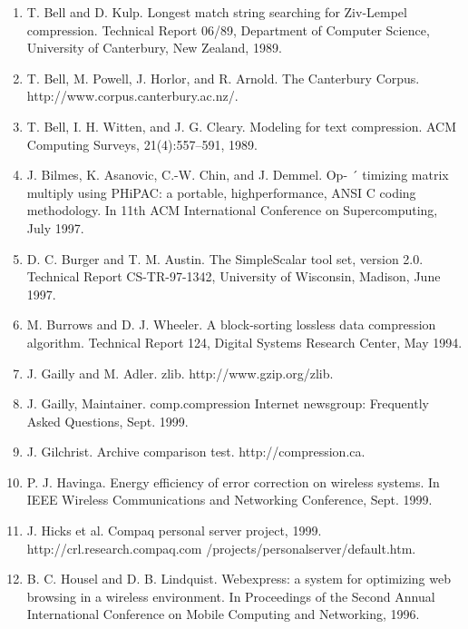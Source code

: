 \documentclass{article}
\begin{document}
\begin{enumerate}
	\item T. Bell and D. Kulp. Longest match string searching for
	Ziv-Lempel compression. Technical Report 06/89, Department of Computer Science, University of Canterbury,
	New Zealand, 1989.
	
	\item T. Bell, M. Powell, J. Horlor, and R. Arnold. The Canterbury Corpus. http://www.corpus.canterbury.ac.nz/.

	\item T. Bell, I. H. Witten, and J. G. Cleary. Modeling for text
	compression. ACM Computing Surveys, 21(4):557–591,
	1989.

	\item J. Bilmes, K. Asanovic, C.-W. Chin, and J. Demmel. Op- ´
	timizing matrix multiply using PHiPAC: a portable, highperformance, ANSI C coding methodology. In 11th ACM
	International Conference on Supercomputing, July 1997.
	
	\item D. C. Burger and T. M. Austin. The SimpleScalar tool
	set, version 2.0. Technical Report CS-TR-97-1342, University of Wisconsin, Madison, June 1997.
	
	\item M. Burrows and D. J. Wheeler. A block-sorting lossless
	data compression algorithm. Technical Report 124, Digital Systems Research Center, May 1994.
	
	\item J. Gailly and M. Adler. zlib. http://www.gzip.org/zlib.
	
	\item J. Gailly, Maintainer. comp.compression Internet
	newsgroup: Frequently Asked Questions, Sept. 1999.

	\item J. Gilchrist. Archive comparison test.
	http://compression.ca.
	
	\item P. J. Havinga. Energy efficiency of error correction on
	wireless systems. In IEEE Wireless Communications and
	Networking Conference, Sept. 1999.
	
	\item J. Hicks et al. Compaq personal server
	project, 1999. http://crl.research.compaq.com
	/projects/personalserver/default.htm.

	\item B. C. Housel and D. B. Lindquist. Webexpress: a system
	for optimizing web browsing in a wireless environment.
	In Proceedings of the Second Annual International Conference on Mobile Computing and Networking, 1996.


\end{enumerate}
\end{document}
